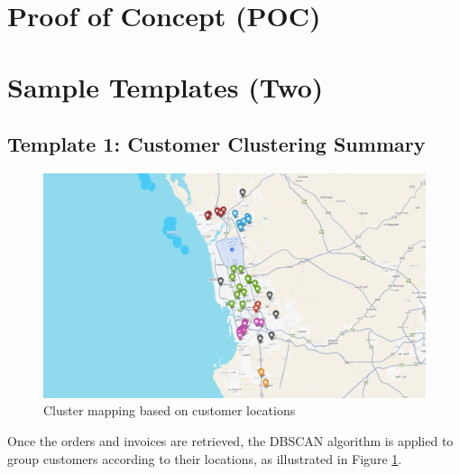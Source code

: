 \documentclass[a4paper,12pt, final]{article}
\begin{document}
\section{Proof of Concept (POC)}


\section{Sample Templates (Two)}
\subsection{Template 1: Customer Clustering Summary}

\begin{figure}[htbp]
    \centering
    \includegraphics[width=\textwidth]{gfx/map_clusters.png}
    \caption{Cluster mapping based on customer locations}
    \label{fig:map_clusters}
\end{figure}
Once the orders and invoices are retrieved, the DBSCAN algorithm is applied to group customers according to their locations, as illustrated in Figure \ref{fig:map_clusters}.
\newpage
\end{document}

